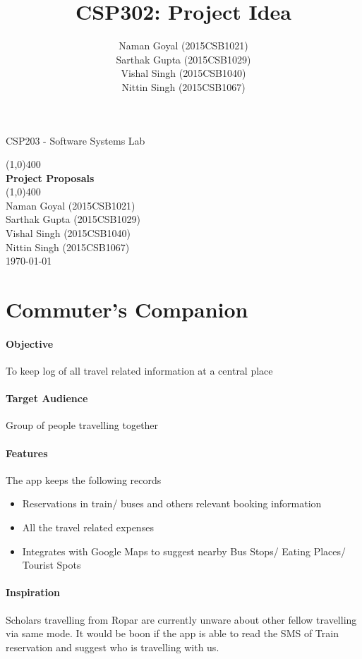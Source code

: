 \documentclass{article}
\title{CSP302: Project Idea}
\author{Naman Goyal (2015CSB1021) \\
Sarthak Gupta (2015CSB1029) \\
Vishal Singh (2015CSB1040) \\
Nittin Singh (2015CSB1067)
}
\begin{document}
\begin{titlepage}
\begin{center}
\vspace{1cm}
\Large{CSP203 - Software Systems Lab}
\vfill

\line(1,0){400}\\[1mm]
\huge{\textbf{Project Proposals}}\\
\line(1,0){400}\\
\vfill
\Large{Naman Goyal (2015CSB1021) \\
Sarthak Gupta (2015CSB1029) \\
Vishal Singh (2015CSB1040) \\
Nittin Singh (2015CSB1067)
}\\

\vfill
\today
\end{center}
\end{titlepage}

\tableofcontents
\clearpage

\section{Commuter's Companion}

\paragraph{Objective}
To keep log of all travel related information at a central place
\paragraph{Target Audience}
Group of people travelling together
\paragraph{Features}
The app keeps the following records
\begin{itemize}
    \item Reservations in train/ buses and others relevant booking information
    \item All the travel related expenses
    \item Integrates with Google Maps to suggest nearby Bus Stops/ Eating Places/ Tourist Spots
\end{itemize}
\paragraph{Inspiration}
Scholars travelling from Ropar are currently unware about other fellow travelling via same mode. It would be boon if the app is able to read the SMS of Train reservation and suggest who is travelling with us.
\end{document}
